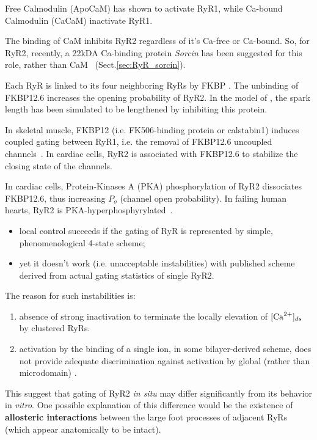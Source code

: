 \begin{enumerate}
\label{sec:calmodulin-RyR1}
  
  Free Calmodulin (ApoCaM) has shown to activate RyR1, while Ca-bound Calmodulin
  (CaCaM) inactivate RyR1. 
  
The binding of CaM inhibits RyR2 regardless of it's Ca-free or Ca-bound. So, for
RyR2, recently, a 22kDA Ca-binding protein {\it Sorcin} has been suggested for
this role, rather than CaM~\citep{Lokuta1997} (Sect.\ref{sec:RyR_sorcin}).

  Each RyR is linked to its four neighboring RyRs by FKBP
  \citep{wagenknecht1997, marx2001}. The unbinding of FKBP12.6 increases the
  opening probability of RyR2. In the model of \cite{sobie2002tcas}, the spark
  length has been simulated to be lengthened by inhibiting this protein.
\end{enumerate}

\begin{framed}
  In skeletal muscle, FKBP12 (i.e. FK506-binding protein or
  calstabin1) induces coupled gating between RyR1, i.e. the removal of
  FKBP12.6 uncoupled channels~\citep{marx1998}. In cardiac cells, RyR2
  is associated with FKBP12.6 to stabilize the closing state of the
  channels.

  In cardiac cells, Protein-Kinases A (PKA) phosphorylation of RyR2
  dissociates FKBP12.6, thus increasing $P_o$ (channel open
  probability). In failing human hearts, RyR2 is
  PKA-hyperphosphyrylated~\citep{marx2000}.
\end{framed}

  \begin{itemize}
  \item local control succeeds if the gating of RyR is represented by
    simple, phenomenological 4-state scheme; 

  \item yet it doesn't work (i.e. unacceptable instabilities) with
    published scheme derived from actual gating statistics of single
    RyR2.
  \end{itemize}
  The reason for such instabilities is:
  \begin{enumerate}
  \item absence of strong inactivation to terminate the locally
    elevation of $[\ce{Ca^2+}]_{ds}$ by clustered RyRs. 

  \item activation by the binding of a single  ion, in some
    bilayer-derived scheme, does not provide adequate discrimination
    against activation by global (rather than microdomain) . 
  \end{enumerate}
  This suggest that gating of RyR2 {\it in situ} may differ
  significantly from its behavior in {\it vitro}. One possible
  explanation of this difference would be the existence of {\bf
    allosteric interactions} between the large foot processes of
  adjacent RyRs (which appear anatomically to be intact). 


